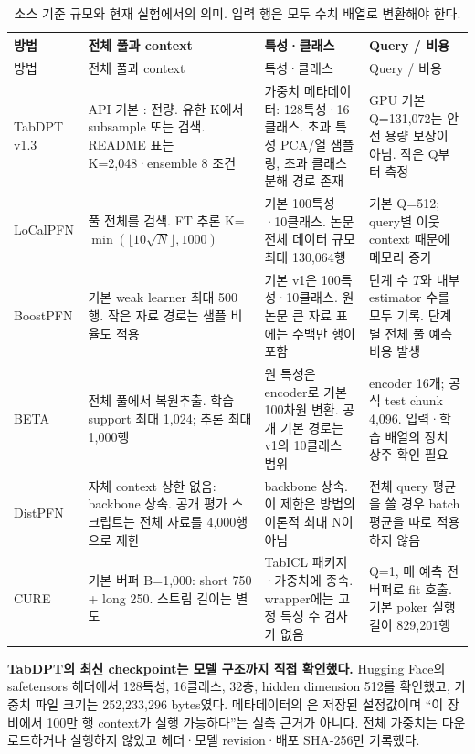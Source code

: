 \small
\begin{longtable}{L{.13\linewidth}L{.28\linewidth}L{.28\linewidth}L{.21\linewidth}}
\caption{소스 기준 규모와 현재 실험에서의 의미. 입력 행은 모두 수치 배열로 변환해야 한다.}\\
\toprule 방법 & 전체 풀과 context & 특성·클래스 & Query / 비용\\\midrule\endfirsthead
\toprule 방법 & 전체 풀과 context & 특성·클래스 & Query / 비용\\\midrule\endhead
TabDPT v1.3 & API 기본 : 전량. 유한 K에서 subsample 또는 검색. README 표는 K=2,048·ensemble 8 조건 & 가중치 메타데이터: 128특성·16클래스. 초과 특성 PCA/열 샘플링, 초과 클래스 분해 경로 존재 & GPU 기본 Q=131,072는 안전 용량 보장이 아님. 작은 Q부터 측정\\
LoCalPFN & 풀 전체를 검색. FT 추론 K=$\min(\lfloor10\sqrt N\rfloor,1000)$ & 기본 100특성·10클래스. 논문 전체 데이터 규모 최대 130,064행 & 기본 Q=512; query별 이웃 context 때문에 메모리 증가\\
BoostPFN & 기본 weak learner 최대 500행. 작은 자료 경로는 샘플 비율도 적용 & 기본 v1은 100특성·10클래스. 원 논문 큰 자료 표에는 수백만 행이 포함 & 단계 수 $T$와 내부 estimator 수를 모두 기록. 단계별 전체 풀 예측 비용 발생\\
BETA & 전체 풀에서 복원추출. 학습 support 최대 1,024; 추론 최대 1,000행 & 원 특성은 encoder로 기본 100차원 변환. 공개 기본 경로는 v1의 10클래스 범위 & encoder 16개; 공식 test chunk 4,096. 입력·학습 배열의 장치 상주 확인 필요\\
DistPFN & 자체 context 상한 없음: backbone 상속. 공개 평가 스크립트는 전체 자료를 4,000행으로 제한 & backbone 상속. 이 제한은 방법의 이론적 최대 N이 아님 & 전체 query 평균을 쓸 경우 batch 평균을 따로 적용하지 않음\\
CURE & 기본 버퍼 B=1,000: short 750 + long 250. 스트림 길이는 별도 & TabICL 패키지·가중치에 종속. wrapper에는 고정 특성 수 검사가 없음 & Q=1, 매 예측 전 버퍼로 fit 호출. 기본 poker 실행 길이 829,201행\\
\bottomrule
\end{longtable}
\normalsize

\textbf{TabDPT의 최신 checkpoint는 모델 구조까지 직접 확인했다.} Hugging Face의 safetensors 헤더에서 128특성, 16클래스, 32층, hidden dimension 512를 확인했고, 가중치 파일 크기는 252,233,296 bytes였다. 메타데이터의 은 저장된 설정값이며 ``이 장비에서 100만 행 context가 실행 가능하다''는 실측 근거가 아니다. 전체 가중치는 다운로드하거나 실행하지 않았고 헤더·모델 revision·배포 SHA-256만 기록했다.


